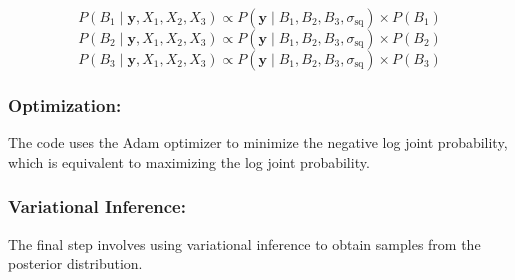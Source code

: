 \documentclass{article}
\begin{document}
\[
P(B_1 \mid \mathbf{y}, X_1, X_2, X_3) \propto P(\mathbf{y} \mid B_1, B_2, B_3, \sigma_{\text{sq}}) \times P(B_1)
\]
\[
P(B_2 \mid \mathbf{y}, X_1, X_2, X_3) \propto P(\mathbf{y} \mid B_1, B_2, B_3, \sigma_{\text{sq}}) \times P(B_2)
\]
\[
P(B_3 \mid \mathbf{y}, X_1, X_2, X_3) \propto P(\mathbf{y} \mid B_1, B_2, B_3, \sigma_{\text{sq}}) \times P(B_3)
\]

\subsubsection*{Optimization:}
The code uses the Adam optimizer to minimize the negative log joint probability, which is equivalent to maximizing the log joint probability.

\subsubsection*{Variational Inference:}
The final step involves using variational inference to obtain samples from the posterior distribution.
\end{document}
